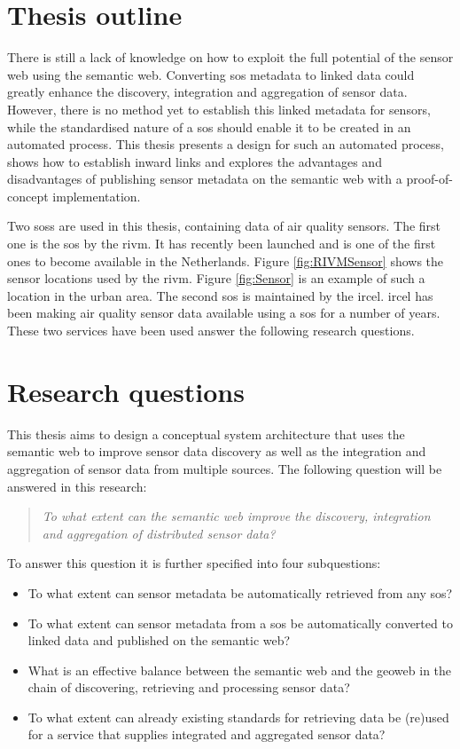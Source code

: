 \section{Thesis outline}
There is still a lack of knowledge on how to exploit the full potential of the sensor web using the semantic web. Converting \ac{sos} metadata to linked data could greatly enhance the discovery, integration and aggregation of sensor data. However, there is no method yet to establish this linked metadata for sensors, while the standardised nature of a \ac{sos} should enable it to be created in an automated process. This thesis presents a design for such an automated process, shows how to establish inward links and explores the advantages and disadvantages of publishing sensor metadata on the semantic web with a proof-of-concept implementation. 

Two \aclp{sos} are used in this thesis, containing data of air quality sensors. The first one is the \ac{sos} by the \ac{rivm}. It has recently been launched and is one of the first ones to become available in the Netherlands. Figure \ref{fig:RIVMSensor} shows the sensor locations used by the \ac{rivm}. Figure \ref{fig:Sensor} is an example of such a location in the urban area. The second \ac{sos} is maintained by the \ac{ircel}. \ac{ircel} has been making air quality sensor data available using a \ac{sos} for a number of years. These two services have been used answer the following research questions. 


\section{Research questions}
This thesis aims to design a conceptual system architecture that uses the semantic web to improve sensor data discovery as well as the integration and aggregation of sensor data from multiple sources. The following question will be answered in this research:    

\begin{quote}
	\textit{To what extent can the semantic web improve the discovery, integration and aggregation of distributed sensor data?}
\end{quote}

To answer this question it is further specified into four subquestions:
\begin{itemize}
	\item To what extent can sensor metadata be automatically retrieved from any \acl{sos}?
	\item To what extent can sensor metadata from a \acl{sos} be automatically converted to linked data and published on the semantic web?
	\item  What is an effective balance between the semantic web and the geoweb in the chain of discovering, retrieving and processing sensor data?
	\item To what extent can already existing standards for retrieving data be (re)used for a service that supplies integrated and aggregated sensor data?
\end{itemize}

